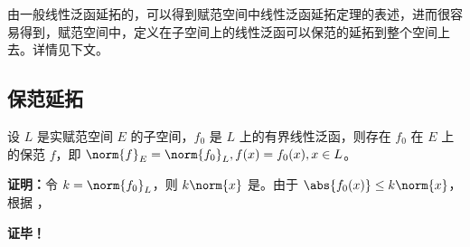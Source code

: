 

由一般线性泛函延拓的，可以得到赋范空间中线性泛函延拓定理的表述，进而很容易得到，赋范空间中，定义在子空间上的线性泛函可以保范的延拓到整个空间上去。详情见下文。

\subsection{保范延拓}

\begin{theorem}{}
设 $L$ 是实赋范空间 $E$ 的子空间，$f_0$ 是 $L$ 上的有界线性泛函，则存在 $f_0$ 在 $E$ 上的保范 $f$，即 $\norm{f}_{E}=\norm{f_0}_{L},f(x)=f_0(x),x\in L$。
\end{theorem}

\textbf{证明：}令 $k=\norm{f_0}_{L}$，则 $k\norm{x}$ 是。由于 $\abs{f_0(x)}\leq k\norm{x}$，根据 ，$$


\textbf{证毕！}
